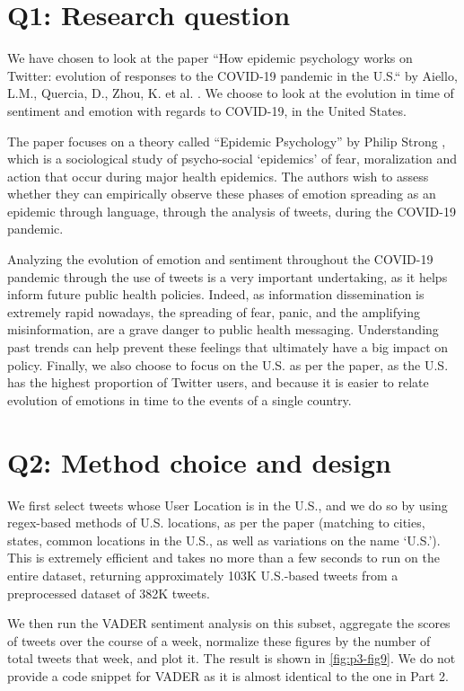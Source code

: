 \section*{Q1: Research question}
We have chosen to look at the paper “How epidemic psychology works on Twitter: evolution of responses to the COVID-19 pandemic in the U.S.“ by Aiello, L.M., Quercia, D., Zhou, K. et al. \cite{aiello2021epidemic}. We choose to look at the evolution in time of sentiment and emotion with regards to COVID-19, in the United States. 

The paper focuses on a theory called “Epidemic Psychology” by Philip Strong \cite{strong1990epidemic}, which is a sociological study of psycho-social ‘epidemics’ of fear, moralization and action that occur during major health epidemics. The authors wish to assess whether they can empirically observe these phases of emotion spreading as an epidemic through language, through the analysis of tweets, during the COVID-19 pandemic. 

Analyzing the evolution of emotion and sentiment throughout the COVID-19 pandemic through the use of tweets is a very important undertaking, as it helps inform future public health policies. Indeed, as information dissemination is extremely rapid nowadays, the spreading of fear, panic, and the amplifying misinformation, are a grave danger to public health messaging. Understanding past trends can help prevent these feelings that ultimately have a big impact on policy. Finally, we also choose to focus on the U.S. as per the paper, as the U.S. has the highest proportion of Twitter users, and because it is easier to relate evolution of emotions in time to the events of a single country.


\section*{Q2: Method choice and design}
We first select tweets whose User Location is in the U.S., and we do so by using regex-based methods of U.S. locations, as per the paper (matching to cities, states, common locations in the U.S., as well as variations on the name ‘U.S.’). This is extremely efficient and takes no more than a few seconds to run on the entire dataset, returning approximately 103K U.S.-based tweets from a preprocessed dataset of 382K tweets. 

We then run the VADER sentiment analysis on this subset, aggregate the scores of tweets over the course of a week, normalize these figures by the number of total tweets that week, and plot it. The result is shown in \cref{fig:p3-fig9}. We do not provide a code snippet for VADER as it is almost identical to the one in Part 2. 

